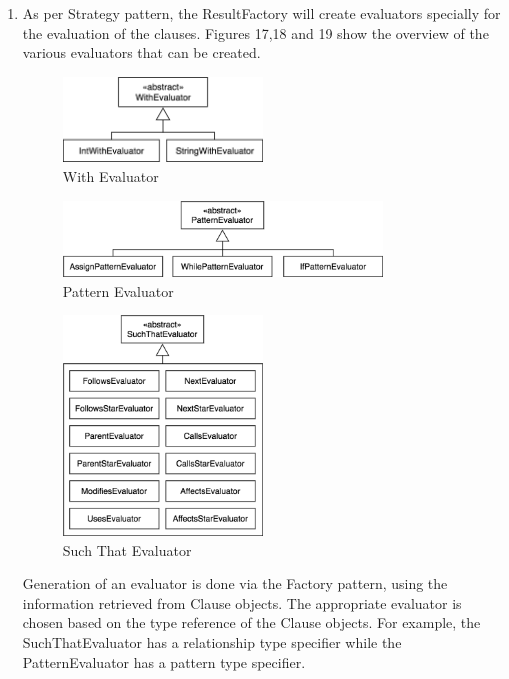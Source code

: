 \documentclass[12pt]{article}
\begin{document}
{{{{{{{{{{{{{\begin{enumerate}
\item As per Strategy pattern, the ResultFactory will create evaluators specially for the evaluation of the clauses. Figures 17,18 and 19 show the overview of the various evaluators that can be created.
   \begin{center}
\begin{figure}[H]
  \caption{With Evaluator}
 \includegraphics[width=0.5\textwidth]{WithEvaluator.png}
\end{figure}
\end{center}
\begin{figure}[H]
  \centering 
  \caption{Pattern Evaluator}
 \includegraphics[width=0.8\textwidth]{PatternEvaluator.png}
\end{figure}
\begin{figure}[H]
  \centering 
  \caption{Such That Evaluator}
 \includegraphics[width=0.5\textwidth]{SuchThatEvaluator.png}
\end{figure}
Generation of an evaluator is done via the Factory pattern, using the information retrieved from Clause objects. The appropriate evaluator is chosen based on the type reference of the Clause objects. For example, the SuchThatEvaluator has a relationship type specifier while the PatternEvaluator has a pattern type specifier.

\end{enumerate}}}}}}}}}}}}}}
\end{document}
